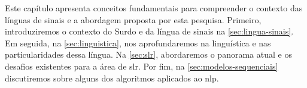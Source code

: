 Este capítulo apresenta conceitos fundamentais para compreender o contexto das línguas de sinais e a abordagem proposta por esta pesquisa.
Primeiro, introduziremos o contexto do Surdo e da língua de sinais na \autoref{sec:lingua-sinais}.
Em seguida, na \autoref{sec:linguistica}, nos aprofundaremos na linguística e nas particularidades dessa língua.
Na \autoref{sec:slr}, abordaremos o panorama atual e os desafios existentes para a área de \acrlong{slr}.
Por fim, na \autoref{sec:modelos-sequenciais} discutiremos sobre alguns dos algoritmos aplicados ao \acrlong{nlp}.









